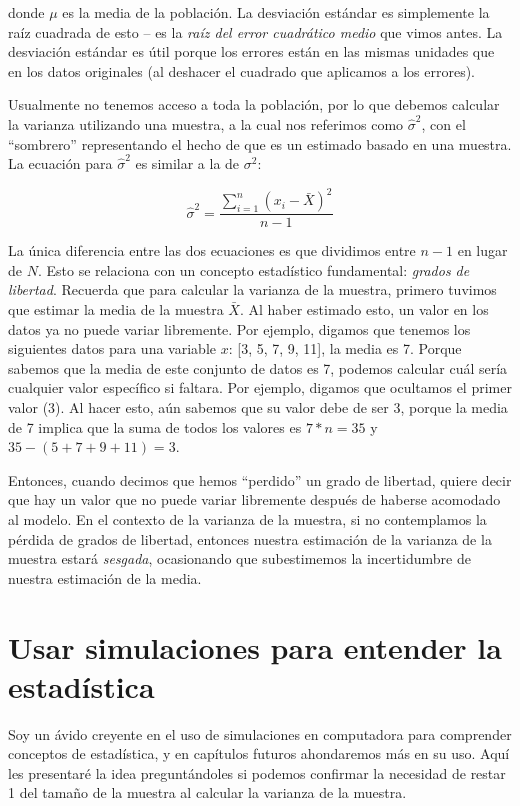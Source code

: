 \documentclass[
  12pt,
]{book}
\begin{document}
donde \(\mu\) es la media de la población. La desviación estándar es simplemente la raíz cuadrada de esto -- es la \emph{raíz del error cuadrático medio} que vimos antes. La desviación estándar es útil porque los errores están en las mismas unidades que en los datos originales (al deshacer el cuadrado que aplicamos a los errores).

Usualmente no tenemos acceso a toda la población, por lo que debemos calcular la varianza utilizando una muestra, a la cual nos referimos como \(\hat{\sigma}^2\), con el ``sombrero'' representando el hecho de que es un estimado basado en una muestra. La ecuación para \(\hat{\sigma}^2\) es similar a la de \(\sigma^2\):

\[
\hat{\sigma}^2 = \frac{\sum_{i=1}^n (x_i - \bar{X})^2}{n-1}
\]

La única diferencia entre las dos ecuaciones es que dividimos entre \(n - 1\) en lugar de \(N\). Esto se relaciona con un concepto estadístico fundamental: \emph{grados de libertad}. Recuerda que para calcular la varianza de la muestra, primero tuvimos que estimar la media de la muestra \(\bar{X}\). Al haber estimado esto, un valor en los datos ya no puede variar libremente. Por ejemplo, digamos que tenemos los siguientes datos para una variable \(x\): {[}3, 5, 7, 9, 11{]}, la media es 7. Porque sabemos que la media de este conjunto de datos es 7, podemos calcular cuál sería cualquier valor específico si faltara. Por ejemplo, digamos que ocultamos el primer valor (3). Al hacer esto, aún sabemos que su valor debe de ser 3, porque la media de 7 implica que la suma de todos los valores es \(7 * n = 35\) y \(35 - (5 + 7 + 9 + 11) = 3\).

Entonces, cuando decimos que hemos ``perdido'' un grado de libertad, quiere decir que hay un valor que no puede variar libremente después de haberse acomodado al modelo. En el contexto de la varianza de la muestra, si no contemplamos la pérdida de grados de libertad, entonces nuestra estimación de la varianza de la muestra estará \emph{sesgada}, ocasionando que subestimemos la incertidumbre de nuestra estimación de la media.

\hypertarget{usar-simulaciones-para-entender-la-estaduxedstica}{%
\section{Usar simulaciones para entender la estadística}\label{usar-simulaciones-para-entender-la-estaduxedstica}}

Soy un ávido creyente en el uso de simulaciones en computadora para comprender conceptos de estadística, y en capítulos futuros ahondaremos más en su uso. Aquí les presentaré la idea preguntándoles si podemos confirmar la necesidad de restar 1 del tamaño de la muestra al calcular la varianza de la muestra.
\end{document}
